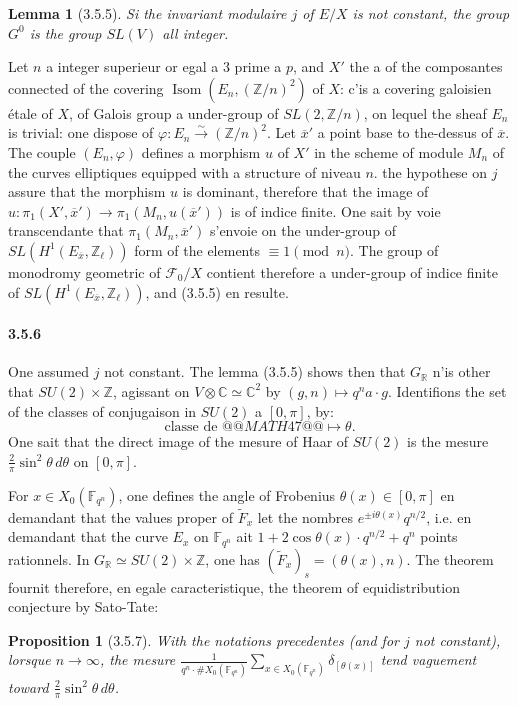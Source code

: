 \documentclass[12pt,a4paper]{article}
\theoremstyle{plain}
\newtheorem{lemma}[theorem]{Lemma}
\newtheorem{proposition}[theorem]{Proposition}
\theoremstyle{definition}
\theoremstyle{remark}
\DeclareMathOperator{\Isom}{Isom}
\newcommand{\CC}{{\mathbb{C}}}
\newcommand{\FF}{{\mathbb{F}}}
\newcommand{\RR}{{\mathbb{R}}}
\newcommand{\ZZ}{{\mathbb{Z}}}
\begin{document}
\begin{lemma}[3.5.5]
Si the invariant modulaire $j$ of $E/X$ is not constant, the group $G^0$ is the group $SL(V)$ all integer.
\end{lemma}

Let $n$ a integer superieur or egal a $3$ prime a $p$, and $X'$ the a of the composantes connected of the covering $\Isom(E_n, (\ZZ/n)^2)$ of $X$: c'is a covering galoisien étale of $X$, of Galois group a under-group of $SL(2, \ZZ/n)$, on lequel the sheaf $E_n$ is trivial: one dispose of $\varphi : E_n \xrightarrow{\sim} (\ZZ/n)^2$. Let $\overline{x}'$ a point base to the-dessus of $\overline{x}$. The couple $(E_n, \varphi)$ defines a morphism $u$ of $X'$ in the scheme of module $M_n$ of the curves elliptiques equipped with a structure of niveau $n$. the hypothese on $j$ assure that the morphism $u$ is dominant, therefore that the image of $u : \pi_1(X', \overline{x}') \to \pi_1(M_n, u(\overline{x}'))$ is of indice finite. One sait by voie transcendante that $\pi_1(M_n, \overline{x}')$ s'envoie on the under-group of $SL(H^1(E_{\overline{x}}, \ZZ_\ell))$ form of the elements $\equiv 1 \pmod{n}$. The group of monodromy geometric of $\mathscr{F}_0/X$ contient therefore a under-group of indice finite of $SL(H^1(E_{\overline{x}}, \ZZ_\ell))$, and (3.5.5) en resulte.

\paragraph{3.5.6}
One assumed $j$ not constant. The lemma (3.5.5) shows then that $G_\RR$ n'is other that $SU(2) \times \ZZ$, agissant on $V \otimes \CC \simeq \CC^2$ by $(g, n) \mapsto q^n a \cdot g$. Identifions the set of the classes of conjugaison in $SU(2)$ a $[0, \pi]$, by:
\[ \text{classe de } @@MATH47@@ \mapsto \theta. \]
One sait that the direct image of the mesure of Haar of $SU(2)$ is the mesure $\frac{2}{\pi} \sin^2\theta\, d\theta$ on $[0, \pi]$.

For $x \in X_0(\FF_{q^n})$, one defines the angle of Frobenius $\theta(x) \in [0, \pi]$ en demandant that the values proper of $\tilde{F}_x$ let the nombres $e^{\pm i\theta(x)} q^{n/2}$, i.e. en demandant that the curve $E_x$ on $\FF_{q^n}$ ait $1 + 2\cos\theta(x) \cdot q^{n/2} + q^n$ points rationnels. In $G_\RR \simeq SU(2) \times \ZZ$, one has $(\tilde{F}_x)_s = (\theta(x), n)$. The theorem fournit therefore, en egale caracteristique, the theorem of equidistribution conjecture by Sato-Tate:


\begin{proposition}[3.5.7]
With the notations precedentes (and for $j$ not constant), lorsque $n \to \infty$, the mesure $\frac{1}{q^n \cdot \#X_0(\FF_{q^n})} \sum_{x \in X_0(\FF_{q^n})} \delta_{[\theta(x)]}$ tend vaguement toward $\frac{2}{\pi} \sin^2\theta\, d\theta$.
\end{proposition}
\end{document}
